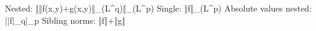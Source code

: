 Nested: ‖‖f(x,y)+g(x,y)‖_(L^q)‖_(L^p)
Single: ‖f‖_(L^p)
Absolute values nested: ||f|_q|_p
Sibling norms: ‖f‖+‖g‖